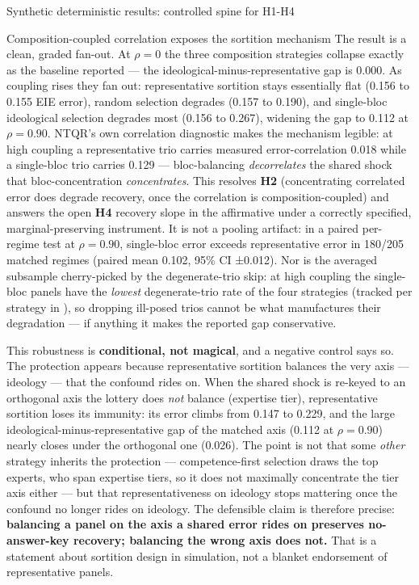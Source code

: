 \documentclass[
  ignorenonframetext,
]{beamer}
\begin{document}
\begin{frame}{Synthetic deterministic results:
controlled spine for H1-H4}
\begin{block}{Composition-coupled correlation exposes the sortition
mechanism}
The result is a clean, graded fan-out. At \(\rho=0\) the three
composition strategies collapse exactly as the baseline reported --- the
ideological-minus-representative gap is 0.000. As coupling rises they
fan out: representative sortition stays essentially flat (0.156 to 0.155
EIE error), random selection degrades (0.157 to 0.190), and single-bloc
ideological selection degrades most (0.156 to 0.267), widening the gap
to 0.112 at \(\rho=0.90\). NTQR's own correlation diagnostic makes the
mechanism legible: at high coupling a representative trio carries
measured error-correlation 0.018 while a single-bloc trio carries 0.129
--- bloc-balancing \emph{decorrelates} the shared shock that
bloc-concentration \emph{concentrates}. This resolves \textbf{H2}
(concentrating correlated error does degrade recovery, once the
correlation is composition-coupled) and answers the open \textbf{H4}
recovery slope in the affirmative under a correctly specified,
marginal-preserving instrument. It is not a pooling artifact: in a
paired per-regime test at \(\rho=0.90\), single-bloc error exceeds
representative error in 180/205 matched regimes (paired mean 0.102, 95\%
CI ±0.012). Nor is the averaged subsample cherry-picked by the
degenerate-trio skip: at high coupling the single-bloc panels have the
\emph{lowest} degenerate-trio rate of the four strategies (tracked per
strategy in ), so dropping ill-posed
trios cannot be what manufactures their degradation --- if anything it
makes the reported gap conservative.

This robustness is \textbf{conditional, not magical}, and a negative
control says so. The protection appears because representative sortition
balances the very axis --- ideology --- that the confound rides on. When
the shared shock is re-keyed to an orthogonal axis the lottery does
\emph{not} balance (expertise tier), representative sortition loses its
immunity: its error climbs from 0.147 to 0.229, and the large
ideological-minus-representative gap of the matched axis (0.112 at
\(\rho=0.90\)) nearly closes under the orthogonal one (0.026). The point
is not that some \emph{other} strategy inherits the protection ---
competence-first selection draws the top experts, who span expertise
tiers, so it does not maximally concentrate the tier axis either --- but
that representativeness on ideology stops mattering once the confound no
longer rides on ideology. The defensible claim is therefore precise:
\textbf{balancing a panel on the axis a shared error rides on preserves
no-answer-key recovery; balancing the wrong axis does not.} That is a
statement about sortition design in simulation, not a blanket
endorsement of representative panels.


\end{block}
\end{frame}
\end{document}
